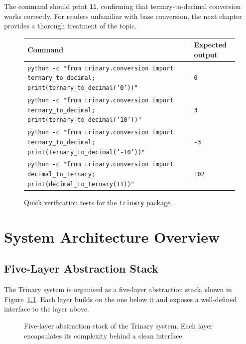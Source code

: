 The command should print \texttt{11}, confirming that ternary-to-decimal conversion works correctly. For readers unfamiliar with base conversion, the next chapter provides a thorough treatment of the topic.

\begin{figure}[h]
\centering
\begin{tabular}{ll}
\toprule
Command & Expected output \\
\midrule
\texttt{python -c "from trinary.conversion import ternary\_to\_decimal; print(ternary\_to\_decimal('0'))"} & \texttt{0} \\
\texttt{python -c "from trinary.conversion import ternary\_to\_decimal; print(ternary\_to\_decimal('10'))"} & \texttt{3} \\
\texttt{python -c "from trinary.conversion import ternary\_to\_decimal; print(ternary\_to\_decimal('-10'))"} & \texttt{-3} \\
\texttt{python -c "from trinary.conversion import decimal\_to\_ternary; print(decimal\_to\_ternary(11))"} & \texttt{102} \\
\bottomrule
\end{tabular}
\caption{Quick verification tests for the \texttt{trinary} package.}
\label{tab:verify-tests}
\end{figure}


\chapter{System Architecture Overview}

\section{Five-Layer Abstraction Stack}

The Trinary system is organised as a five-layer abstraction stack, shown in Figure~\ref{fig:stack}. Each layer builds on the one below it and exposes a well-defined interface to the layer above.

\begin{figure}[h]
\centering
{}
\caption{Five-layer abstraction stack of the Trinary system. Each layer encapsulates its complexity behind a clean interface.}
\label{fig:stack}
\end{figure}

